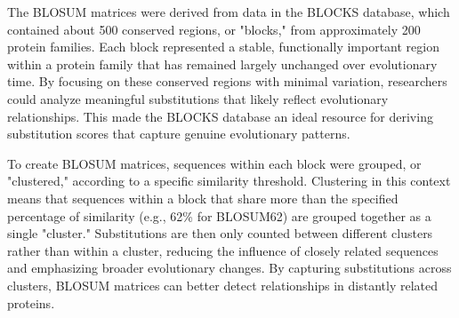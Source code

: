 The BLOSUM matrices were derived from data in the BLOCKS database, which contained about 500 conserved regions, or "blocks," from approximately 200 protein families.
Each block represented a stable, functionally important region within a protein family that has remained largely unchanged over evolutionary time. By focusing on these conserved regions with minimal variation, researchers could analyze meaningful substitutions that likely reflect evolutionary relationships. This made the BLOCKS database an ideal resource for deriving substitution scores that capture genuine evolutionary patterns.

To create BLOSUM matrices,
sequences within each block were grouped, or "clustered," according to a specific similarity threshold. Clustering in this context means that sequences within a block that share more than the specified percentage of similarity (e.g., 62\% for BLOSUM62) are grouped together as a single "cluster." Substitutions are then only counted between different clusters rather than within a cluster, reducing the influence of closely related sequences and emphasizing broader evolutionary changes. By capturing substitutions across clusters, BLOSUM matrices can better detect relationships in distantly related proteins.

